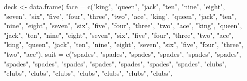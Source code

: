 \documentclass[
  11pt,
]{krantz}
\makeatletter
\newenvironment{Shaded}{\begin{snugshade}}{\end{snugshade}}
\newcommand{\AttributeTok}[1]{\textcolor[rgb]{0.61,0.61,0.61}{#1}}
\newcommand{\FunctionTok}[1]{\textcolor[rgb]{0,0,0}{#1}}
\newcommand{\NormalTok}[1]{#1}
\newcommand{\OtherTok}[1]{\textcolor[rgb]{0.37,0.37,0.37}{#1}}
\newcommand{\StringTok}[1]{\textcolor[rgb]{0.5,0.5,0.5}{#1}}
\newenvironment{kframe}{%
\medskip{}
\setlength{\fboxsep}{.8em}
 \def\at@end@of@kframe{}%
 \ifinner\ifhmode%
  \def\at@end@of@kframe{\end{minipage}}%
  \begin{minipage}{\columnwidth}%
 \fi\fi%
 \def\FrameCommand##1{\hskip\@totalleftmargin \hskip-\fboxsep
 \colorbox{shadecolor}{##1}\hskip-\fboxsep
     \hskip-\linewidth \hskip-\@totalleftmargin \hskip\columnwidth}%
 \MakeFramed {\advance\hsize-\width
   \@totalleftmargin\z@ \linewidth\hsize
   \@setminipage}}%
 {\par\unskip\endMakeFramed%
 \at@end@of@kframe}
\renewenvironment{Shaded}{\begin{kframe}}{\end{kframe}}
\theoremstyle{definition}
\theoremstyle{definition}
\theoremstyle{definition}
\theoremstyle{definition}
\theoremstyle{remark}
\makeatother
\begin{document}
\begin{Shaded}
\begin{Highlighting}[]
\NormalTok{deck }\OtherTok{\textless{}{-}} \FunctionTok{data.frame}\NormalTok{(}
  \AttributeTok{face =} \FunctionTok{c}\NormalTok{(}\StringTok{"king"}\NormalTok{, }\StringTok{"queen"}\NormalTok{, }\StringTok{"jack"}\NormalTok{, }\StringTok{"ten"}\NormalTok{, }\StringTok{"nine"}\NormalTok{, }\StringTok{"eight"}\NormalTok{,}
  \StringTok{"seven"}\NormalTok{, }\StringTok{"six"}\NormalTok{, }\StringTok{"five"}\NormalTok{, }\StringTok{"four"}\NormalTok{, }\StringTok{"three"}\NormalTok{, }\StringTok{"two"}\NormalTok{, }\StringTok{"ace"}\NormalTok{, }
  \StringTok{"king"}\NormalTok{, }\StringTok{"queen"}\NormalTok{, }\StringTok{"jack"}\NormalTok{, }\StringTok{"ten"}\NormalTok{, }\StringTok{"nine"}\NormalTok{, }\StringTok{"eight"}\NormalTok{, }\StringTok{"seven"}\NormalTok{, }
  \StringTok{"six"}\NormalTok{, }\StringTok{"five"}\NormalTok{, }\StringTok{"four"}\NormalTok{, }\StringTok{"three"}\NormalTok{, }\StringTok{"two"}\NormalTok{, }\StringTok{"ace"}\NormalTok{, }\StringTok{"king"}\NormalTok{, }
  \StringTok{"queen"}\NormalTok{, }\StringTok{"jack"}\NormalTok{, }\StringTok{"ten"}\NormalTok{, }\StringTok{"nine"}\NormalTok{, }\StringTok{"eight"}\NormalTok{, }\StringTok{"seven"}\NormalTok{, }\StringTok{"six"}\NormalTok{, }
  \StringTok{"five"}\NormalTok{, }\StringTok{"four"}\NormalTok{, }\StringTok{"three"}\NormalTok{, }\StringTok{"two"}\NormalTok{, }\StringTok{"ace"}\NormalTok{, }\StringTok{"king"}\NormalTok{, }\StringTok{"queen"}\NormalTok{, }
  \StringTok{"jack"}\NormalTok{, }\StringTok{"ten"}\NormalTok{, }\StringTok{"nine"}\NormalTok{, }\StringTok{"eight"}\NormalTok{, }\StringTok{"seven"}\NormalTok{, }\StringTok{"six"}\NormalTok{, }\StringTok{"five"}\NormalTok{, }
  \StringTok{"four"}\NormalTok{, }\StringTok{"three"}\NormalTok{, }\StringTok{"two"}\NormalTok{, }\StringTok{"ace"}\NormalTok{), }
  \AttributeTok{suit =} \FunctionTok{c}\NormalTok{(}\StringTok{"spades"}\NormalTok{, }\StringTok{"spades"}\NormalTok{, }\StringTok{"spades"}\NormalTok{, }\StringTok{"spades"}\NormalTok{, }
  \StringTok{"spades"}\NormalTok{, }\StringTok{"spades"}\NormalTok{, }\StringTok{"spades"}\NormalTok{, }\StringTok{"spades"}\NormalTok{, }\StringTok{"spades"}\NormalTok{, }
  \StringTok{"spades"}\NormalTok{, }\StringTok{"spades"}\NormalTok{, }\StringTok{"spades"}\NormalTok{, }\StringTok{"spades"}\NormalTok{, }\StringTok{"clubs"}\NormalTok{, }\StringTok{"clubs"}\NormalTok{, }
  \StringTok{"clubs"}\NormalTok{, }\StringTok{"clubs"}\NormalTok{, }\StringTok{"clubs"}\NormalTok{, }\StringTok{"clubs"}\NormalTok{, }\StringTok{"clubs"}\NormalTok{, }\StringTok{"clubs"}\NormalTok{, }

\end{Highlighting}
\end{Shaded}
\end{document}
